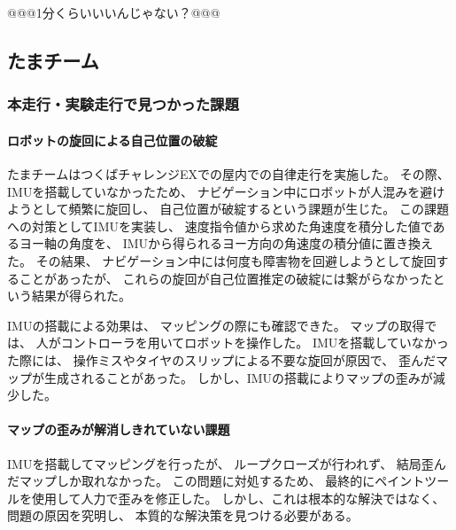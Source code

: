 \documentclass[twocolumn,9pt]{jsproceedings}
\begin{document}
@@@1分くらいいいんじゃない？@@@

\subsection{たまチーム}
\subsubsection{本走行・実験走行で見つかった課題}
\paragraph{ロボットの旋回による自己位置の破綻}


たまチームはつくばチャレンジEXでの屋内での自律走行を実施した。
その際、IMUを搭載していなかったため、
ナビゲーション中にロボットが人混みを避けようとして頻繁に旋回し、
自己位置が破綻するという課題が生じた。
この課題への対策としてIMUを実装し、
速度指令値から求めた角速度を積分した値であるヨー軸の角度を、
IMUから得られるヨー方向の角速度の積分値に置き換えた。
その結果、
ナビゲーション中には何度も障害物を回避しようとして旋回することがあったが、
これらの旋回が自己位置推定の破綻には繋がらなかったという結果が得られた。


IMUの搭載による効果は、
マッピングの際にも確認できた。
マップの取得では、
人がコントローラを用いてロボットを操作した。
IMUを搭載していなかった際には、
操作ミスやタイヤのスリップによる不要な旋回が原因で、
歪んだマップが生成されることがあった。
しかし、IMUの搭載によりマップの歪みが減少した。


\paragraph{マップの歪みが解消しきれていない課題}


IMUを搭載してマッピングを行ったが、
ループクローズが行われず、
結局歪んだマップしか取れなかった。
この問題に対処するため、
最終的にペイントツールを使用して人力で歪みを修正した。
しかし、これは根本的な解決ではなく、
問題の原因を究明し、
本質的な解決策を見つける必要がある。
\end{document}
